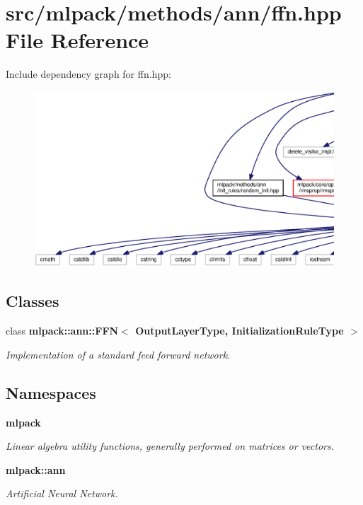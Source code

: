 \section{src/mlpack/methods/ann/ffn.hpp File Reference}
\label{ffn_8hpp}
Include dependency graph for ffn.\+hpp\+:
\nopagebreak
\begin{figure}[H]
\begin{center}
\leavevmode
\includegraphics[width=350pt]{ffn_8hpp__incl}
\end{center}
\end{figure}
\subsection*{Classes}
\begin{DoxyCompactItemize}
\item 
class {\bf mlpack\+::ann\+::\+F\+F\+N$<$ Output\+Layer\+Type, Initialization\+Rule\+Type $>$}
\begin{DoxyCompactList}\small\item\em Implementation of a standard feed forward network. \end{DoxyCompactList}\end{DoxyCompactItemize}
\subsection*{Namespaces}
\begin{DoxyCompactItemize}
\item 
 {\bf mlpack}
\begin{DoxyCompactList}\small\item\em Linear algebra utility functions, generally performed on matrices or vectors. \end{DoxyCompactList}\item 
 {\bf mlpack\+::ann}
\begin{DoxyCompactList}\small\item\em Artificial Neural Network. \end{DoxyCompactList}\end{DoxyCompactItemize}


